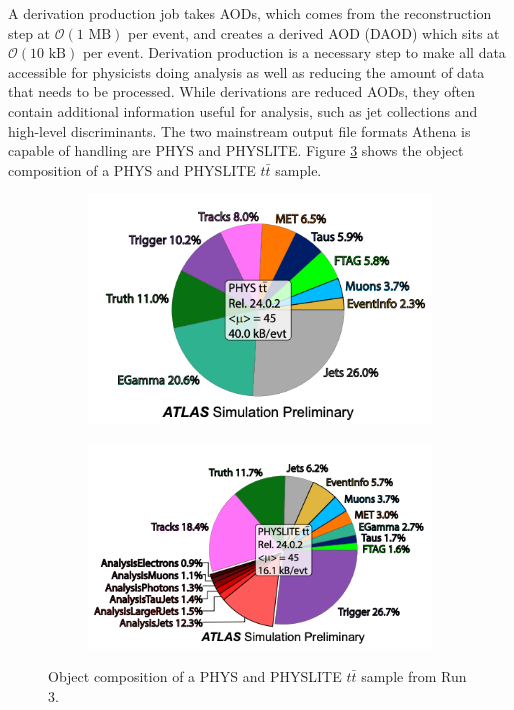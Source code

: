 A derivation production job takes AODs, which comes from the reconstruction step at $\mathcal{O}(1 \text{ MB})$ per event, and creates a derived AOD (DAOD) which sits at $\mathcal{O}(10 \text{ kB})$ per event.
Derivation production is a necessary step to make all data accessible for physicists doing analysis as well as reducing the amount of data that needs to be processed.
While derivations are reduced AODs, they often contain additional information useful for analysis, such as jet collections and high-level discriminants.\cite{PHYSLITE_A_new_2024}
The two mainstream output file formats Athena is capable of handling are PHYS and PHYSLITE.  
Figure \ref{fig:IO_tt_PHYS_vs_PHYSLITE} shows the object composition of a PHYS and PHYSLITE $t\bar{t}$ sample. 
\begin{figure}[h]
    \centering
    \begin{subfigure}{.5\textwidth}
        \centering
        \includegraphics[width=\textwidth]{content/img/tt_PHYS.png}
        \label{fig:IO_tt_PHYS_subA}
      \end{subfigure}%
      \begin{subfigure}{.5\textwidth}
        \centering
        \includegraphics[width=\textwidth]{content/img/tt_PHYSLITE.png}
        \label{fig:IO_tt_PHYSLITE_subB}
      \end{subfigure}%
    \caption{Object composition of a PHYS and PHYSLITE $t\bar{t}$ sample from Run 3.}
    \label{fig:IO_tt_PHYS_vs_PHYSLITE}
\end{figure}
